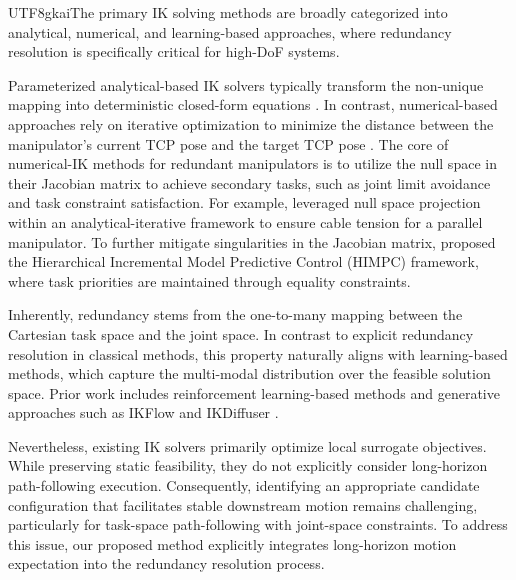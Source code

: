 \documentclass[journal, twoside]{IEEEtran}
\newcommand{\xinyi}[1]{{\color{darkorange}\begin{CJK*}{UTF8}{gkai}#1\end{CJK*}}}
\begin{document}
\xinyi{The primary IK solving methods are broadly categorized into analytical, numerical, and learning-based approaches, where redundancy resolution is specifically critical for high-DoF systems. 

Parameterized analytical-based IK solvers typically transform the non-unique mapping into deterministic closed-form equations \cite{wu2021t}. In contrast, numerical-based approaches rely on iterative optimization to minimize the distance between the manipulator's current TCP pose and the target TCP pose \cite{beeson2015trac}. The core of numerical-IK methods for redundant manipulators is to utilize the null space in their Jacobian matrix to achieve secondary tasks, such as joint limit avoidance \cite{ananthanarayanan2015real} and task constraint satisfaction. For example, \cite{taghirad2011analytic} leveraged null space projection within an analytical-iterative framework to ensure cable tension for a parallel manipulator. To further mitigate singularities in the Jacobian matrix, \cite{wang2024hierarchical} proposed the Hierarchical Incremental Model Predictive Control (HIMPC) framework, where task priorities are maintained through equality constraints.

Inherently, redundancy stems from the one-to-many mapping between the Cartesian task space and the joint space. In contrast to explicit redundancy resolution in classical methods, this property naturally aligns with learning-based methods, which capture the multi-modal distribution over the feasible solution space. Prior work includes reinforcement learning-based methods \cite{malik2022deep} and generative approaches such as IKFlow \cite{ames2022ikflow} and IKDiffuser \cite{zhang2025ikdiffuser}.

Nevertheless, existing IK solvers primarily optimize local surrogate objectives. While preserving static feasibility, they do not explicitly consider long-horizon path-following execution. Consequently, identifying an appropriate candidate configuration that facilitates stable downstream motion remains challenging, particularly for task-space path-following with joint-space constraints. To address this issue, our proposed method explicitly integrates long-horizon motion expectation into the redundancy resolution process.} 
\end{document}
